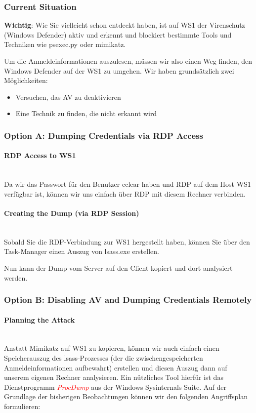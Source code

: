 \subsubsection{Current Situation}
\textbf{Wichtig}: Wie Sie vielleicht schon entdeckt haben, ist auf WS1 der Virenschutz (Windows Defender) aktiv und erkennt und blockiert bestimmte Tools und Techniken wie psexec.py oder mimikatz.

Um die Anmeldeinformationen auszulesen, müssen wir also einen Weg finden, den Windows Defender auf der WS1 zu umgehen. Wir haben grundsätzlich zwei Möglichkeiten:\\
\begin{itemize}
    \item Versuchen, das AV zu deaktivieren
    \item Eine Technik zu finden, die nicht erkannt wird
\end{itemize} 

\subsubsection{Option A: Dumping Credentials via RDP Access}
\paragraph{RDP Access to WS1}\mbox{} \\
Da wir das Passwort für den Benutzer cclear haben und RDP auf dem Host WS1 verfügbar ist, können wir uns einfach über RDP mit diesem Rechner verbinden.

\paragraph{Creating the Dump (via RDP Session)}\mbox{} \\
Sobald Sie die RDP-Verbindung zur WS1 hergestellt haben, können Sie über den Task-Manager einen Auszug von lsass.exe erstellen.

Nun kann der Dump vom Server auf den Client kopiert und dort analysiert werden.

\subsubsection{Option B: Disabling AV and Dumping Credentials Remotely}

\paragraph{Planning the Attack}\mbox{} \\
Anstatt Mimikatz auf WS1 zu kopieren, können wir auch einfach einen Speicherauszug des lsass-Prozesses (der die zwischengespeicherten Anmeldeinformationen aufbewahrt) erstellen und diesen Auszug dann auf unserem eigenen Rechner analysieren.
Ein nützliches Tool hierfür ist das Dienstprogramm \textcolor{red}{\textit{ProcDump}} aus der Windows Sysinternals Suite.
Auf der Grundlage der bisherigen Beobachtungen können wir den folgenden Angriffsplan formulieren:\\

